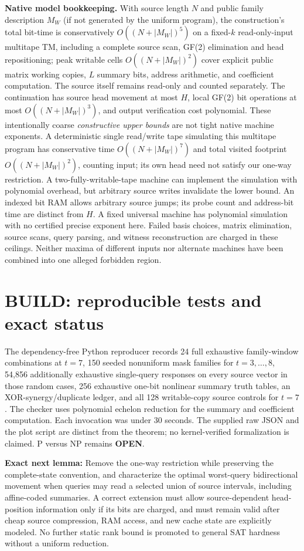 \documentclass[10pt]{article}
\begin{document}
\noindent\textbf{Native model bookkeeping.} With source length $N$ and public family description $M_W$ (if not generated by the uniform program), the construction's total bit-time is conservatively $O((N+|M_W|)^5)$ on a fixed-$k$ read-only-input multitape TM, including a complete source scan, GF(2) elimination and head repositioning; peak writable cells $O((N+|M_W|)^2)$ cover explicit public matrix working copies, $L$ summary bits, address arithmetic, and coefficient computation. The source itself remains read-only and counted separately. The continuation has source head movement at most $H$, local GF(2) bit operations at most $O((N+|M_W|)^3)$, and output verification cost polynomial. These intentionally coarse \emph{constructive upper bounds} are not tight native machine exponents. A deterministic single read/write tape simulating this multitape program has conservative time $O((N+|M_W|)^7)$ and total visited footprint $O((N+|M_W|)^2)$, counting input; its own head need not satisfy our one-way restriction. A two-fully-writable-tape machine can implement the simulation with polynomial overhead, but arbitrary source writes invalidate the lower bound. An indexed bit RAM allows arbitrary source jumps; its probe count and address-bit time are distinct from $H$. A fixed universal machine has polynomial simulation with no certified precise exponent here. Failed basis choices, matrix elimination, source scans, query parsing, and witness reconstruction are charged in these ceilings. Neither maxima of different inputs nor alternate machines have been combined into one alleged forbidden region.

\section{BUILD: reproducible tests and exact status}
The dependency-free Python reproducer records 24 full exhaustive family-window combinations at $t=7$, 150 seeded nonuniform mask families for $t=3,\ldots,8$, 54,856 additionally exhaustive single-query responses on every source vector in those random cases, 256 exhaustive one-bit nonlinear summary truth tables, an XOR-synergy/duplicate ledger, and all 128 writable-copy source controls for $t=7$. The checker uses polynomial echelon reduction for the summary and coefficient computation. Each invocation was under 30 seconds. The supplied raw JSON and the plot script are distinct from the theorem; no kernel-verified formalization is claimed. P versus NP remains \textbf{OPEN}.

\noindent\textbf{Exact next lemma:} Remove the one-way restriction while preserving the complete-state convention, and characterize the optimal worst-query bidirectional movement when queries may read a selected union of source intervals, including affine-coded summaries. A correct extension must allow source-dependent head-position information only if its bits are charged, and must remain valid after cheap source compression, RAM access, and new cache state are explicitly modeled. No further static rank bound is promoted to general SAT hardness without a uniform reduction.
\end{document}
